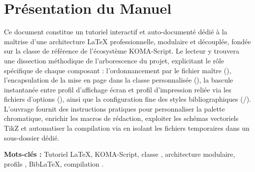 
\section*{Présentation du Manuel}

Ce document constitue un tutoriel interactif et auto-documenté
dédié à la maîtrise d'une architecture \LaTeX{} professionnelle, modulaire et découplée,
fondée sur la classe de référence  de l'écosystème KOMA-Script.
Le lecteur y trouvera une dissection méthodique de l'arborescence du projet,
explicitant le rôle spécifique de chaque composant :
l'ordonnancement par le fichier maître (),
l'encapsulation de la mise en page dans la classe personnalisée (),
la bascule instantanée entre profil d'affichage écran et profil d'impression reliée via les fichiers d'options (),
ainsi que la configuration fine des styles bibliographiques (/).
L'ouvrage fournit des instructions pratiques pour personnaliser la palette chromatique,
enrichir les macros de rédaction, exploiter les schémas vectoriels TikZ
et automatiser la compilation via  en isolant les fichiers temporaires dans un sous-dossier dédié.

\vspace{0.8em}
\noindent\textbf{Mots-clés :} Tutoriel \LaTeX{}, KOMA-Script, classe , architecture modulaire, profils , Bib\LaTeX{}, compilation .

\vspace{1.5cm}

